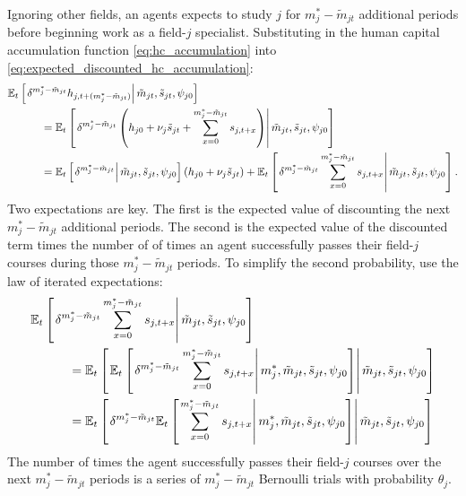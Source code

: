 \documentclass[11 pt]{article}
\newcommand{\pr}[1]{\left( #1 \right)}
\newcommand{\ce}[2]{\left[\left. #1 \right\vert #2 \right]}
\newcommand{\study}{m} %
\newcommand{\pass}{s}
\newcommand{\pstates}{\tilde{\study}_{jt}, \tilde{\pass}_{jt}, \psi_{j0}}
\newcommand*{\ks}[1][t]{\tilde{\pass}_{j #1}}
\begin{document}
Ignoring other fields, an agents expects to study $j$ for $\study_j^* - \tilde{\study}_{jt}$ additional periods before beginning work as a field-$j$ specialist.
Substituting in the human capital accumulation function \eqref{eq:hc_accumulation} into \eqref{eq:expected_discounted_hc_accumulation}:
\begin{align*}
    \EE_t &\ce{
        \delta^{\study_j^* - \tilde{\study}_{jt}}
        h_{j,t + (\study_j^* - \tilde{\study}_{jt})}
    }{\pstates}
    \\
    &\quad\quad=
    \EE_t \ce{
        \delta^{\study_j^* - \tilde{\study}_{jt}}
        \pr{
            h_{j0} 
            + \nu_j \ks 
            + \sum_{x=0}^{\study_j^* - \tilde{\study}_{jt}} 
            \pass_{j, t + x}}
    }{\pstates}
    \\
    &\quad\quad=
    \EE_t \ce{
        \delta^{\study_j^* - \tilde{\study}_{jt}}        
    }{\pstates} \pr{h_{j0} + \nu_j \ks}
    + 
    \EE_t \ce{
        \delta^{\study_j^* - \tilde{\study}_{jt}}
        \sum_{x=0}^{\study_j^* - \tilde{\study}_{jt}} \pass_{j, t + x}
    }{\pstates}.
\end{align*}
Two expectations are key. 
The first is the expected value of discounting the next $\study_j^* - \tilde{\study}_{jt}$ additional periods. 
The second is the expected value of the discounted term times the number of of times an agent successfully passes their field-$j$ courses during those $\study_j^* - \tilde{\study}_{jt}$ periods. 
To simplify the second probability, use the law of iterated expectations:
\begin{align*}
    \EE_t &\ce{
        \delta^{\study_j^* - \tilde{\study}_{jt}}
        \sum_{x=0}^{\study_j^* - \tilde{\study}_{jt}} \pass_{j, t + x}
    }{\pstates}
    \\
    &\quad\quad=
    \EE_t \ce{
        \EE_t \ce{
            \delta^{\study_j^* - \tilde{\study}_{jt}}
            \sum_{x=0}^{\study_j^* - \tilde{\study}_{jt}} \pass_{j, t + x}
        }{\study_j^*, \pstates}
    }{\pstates}
    \\
    &\quad\quad=
    \EE_t \ce{
        \delta^{\study_j^* - \tilde{\study}_{jt}}
        \EE_t \ce{
            \sum_{x=0}^{\study_j^* - \tilde{\study}_{jt}} \pass_{j, t + x}
        }{\study_j^*, \pstates}
    }{\pstates}
\end{align*}
The number of times the agent successfully passes their field-$j$ courses over the next $\study_j^* - \tilde{\study}_{jt}$ periods is a series of $\study_j^* - \tilde{\study}_{jt}$ Bernoulli trials with probability $\theta_j$. 
\end{document}
